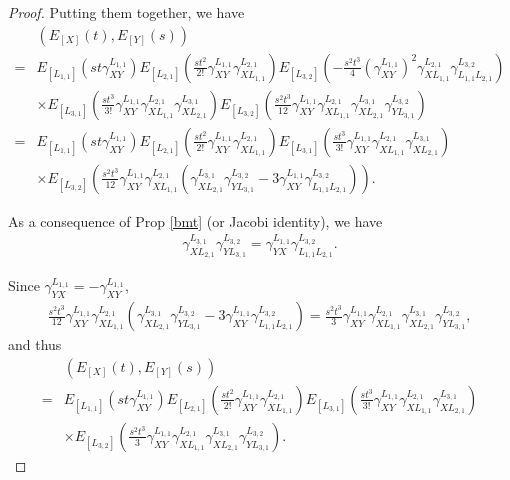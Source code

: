 \documentclass[12pt]{amsart}
\begin{document}
\begin{proof}
   Putting them together, we have
   \begin{align*}
      &(E_{[X]}(t),E_{[Y]}(s)) \\
    = &E_{[L_{1,1}]}(st\gamma_{XY}^{L_{1,1}}) E_{[L_{2,1}]}(\frac{st^2}{2!}\gamma_{XY}^{L_{1,1}}\gamma_{XL_{1,1}}^{L_{2,1}}) E_{[L_{3,2}]}(-\frac{s^2 t^3}{4} (\gamma_{XY}^{L_{1,1}})^2 \gamma_{XL_{1,1}}^{L_{2,1}} \gamma_{L_{1,1}L_{2,1}}^{L_{3,2}}) \\
      & \times  E_{[L_{3,1}]}( \frac{st^3}{3!}\gamma_{XY}^{L_{1,1}}\gamma_{XL_{1,1}}^{L_{2,1}}\gamma_{XL_{2,1}}^{L_{3,1}})  E_{[L_{3,2}]}(\frac{s^2 t^3}{12} \gamma_{XY}^{L_{1,1}} \gamma_{XL_{1,1}}^{L_{2,1}} \gamma_{XL_{2,1}}^{L_{3,1}} \gamma_{YL_{3,1}}^{L_{3,2}}  ) \\
    = &   E_{[L_{1,1}]}(st\gamma_{XY}^{L_{1,1}}) E_{[L_{2,1}]}(\frac{st^2}{2!}\gamma_{XY}^{L_{1,1}}\gamma_{XL_{1,1}}^{L_{2,1}}) E_{[L_{3,1}]}( \frac{st^3}{3!}\gamma_{XY}^{L_{1,1}}\gamma_{XL_{1,1}}^{L_{2,1}}\gamma_{XL_{2,1}}^{L_{3,1}}) \\
      & \times  E_{[L_{3,2}]}(\frac{s^2 t^3}{12} \gamma_{XY}^{L_{1,1}} \gamma_{XL_{1,1}}^{L_{2,1}} (\gamma_{XL_{2,1}}^{L_{3,1}} \gamma_{YL_{3,1}}^{L_{3,2}} - 3 \gamma_{XY}^{L_{1,1}} \gamma_{L_{1,1}L_{2,1}}^{L_{3,2}} ) ).
   \end{align*}
  
   As a consequence of Prop \ref{bmt} (or Jacobi identity), we have 
   \begin{align*}
    \gamma_{XL_{2,1}}^{L_{3,1}} \gamma_{YL_{3,1}}^{L_{3,2}} = \gamma_{YX}^{L_{1,1}}\gamma_{L_{1,1}L_{2,1}}^{L_{3,2}}.
   \end{align*}

   Since $\gamma_{YX}^{L_{1,1}} = - \gamma_{XY}^{L_{1,1}}$, 
   \begin{align*}
    \frac{s^2 t^3}{12} \gamma_{XY}^{L_{1,1}} \gamma_{XL_{1,1}}^{L_{2,1}} (\gamma_{XL_{2,1}}^{L_{3,1}} \gamma_{YL_{3,1}}^{L_{3,2}} - 3 \gamma_{XY}^{L_{1,1}} \gamma_{L_{1,1}L_{2,1}}^{L_{3,2}} ) = \frac{s^2 t^3}{3} \gamma_{XY}^{L_{1,1}} \gamma_{XL_{1,1}}^{L_{2,1}} \gamma_{XL_{2,1}}^{L_{3,1}} \gamma_{YL_{3,1}}^{L_{3,2}},
   \end{align*}
   and thus 
   \begin{align*}
     &(E_{[X]}(t),E_{[Y]}(s))\\
    =&  E_{[L_{1,1}]}(st\gamma_{XY}^{L_{1,1}}) E_{[L_{2,1}]}(\frac{st^2}{2!}\gamma_{XY}^{L_{1,1}}\gamma_{XL_{1,1}}^{L_{2,1}}) E_{[L_{3,1}]}( \frac{st^3}{3!}\gamma_{XY}^{L_{1,1}}\gamma_{XL_{1,1}}^{L_{2,1}}\gamma_{XL_{2,1}}^{L_{3,1}}) \\
     & \times  E_{[L_{3,2}]}( \frac{s^2 t^3}{3} \gamma_{XY}^{L_{1,1}} \gamma_{XL_{1,1}}^{L_{2,1}} \gamma_{XL_{2,1}}^{L_{3,1}} \gamma_{YL_{3,1}}^{L_{3,2}}).
   \end{align*}


\end{proof}
\end{document}
